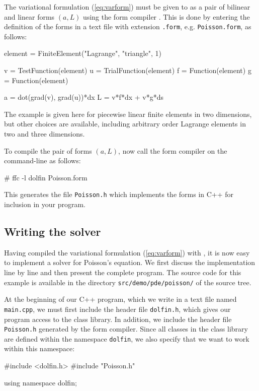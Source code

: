 The variational formulation (\ref{eq:varform}) must be given to
\dolfin{} as a pair of bilinear and linear forms $(a, L)$ using the
form compiler \ffc{}. This is done by entering the definition of
the forms in a text file with extension \texttt{.form},
e.g. \texttt{Poisson.form}, as follows:
\begin{code}
element = FiniteElement("Lagrange", "triangle", 1)

v = TestFunction(element)
u = TrialFunction(element)
f = Function(element)
g = Function(element)

a = dot(grad(v), grad(u))*dx
L = v*f*dx + v*g*ds
\end{code}

The example is given here for piecewise linear finite elements in two
dimensions, but other choices are available, including arbitrary order
Lagrange elements in two and three dimensions.

To compile the pair of forms $(a, L)$, now call the form compiler on
the command-line as follows:
\begin{code}
# ffc -l dolfin Poisson.form
\end{code}
This generates the file \texttt{Poisson.h} which implements the forms
in C++ for inclusion in your \dolfin{} program.

\subsection{Writing the solver}

Having compiled the variational formulation (\ref{eq:varform})
with \ffc{}, it is now easy to implement a solver for Poisson's
equation. We first discuss the implementation line by line and then
present the complete program. The source code for this example is
available in the directory \texttt{src/demo/pde/poisson/} of the \dolfin{}
source tree.

At the beginning of our C++ program, which we write in a text file
named \texttt{main.cpp}, we must first include the header file
\texttt{dolfin.h}, which gives our program access to the \dolfin{}
class library. In addition, we include the header file
\texttt{Poisson.h} generated by the form compiler. Since all classes
in the \dolfin{} class library are defined within the namespace
\texttt{dolfin}, we also specify that we want to work within this
namespace:
\begin{code}
#include <dolfin.h>
#include "Poisson.h"
  
using namespace dolfin;
\end{code}

